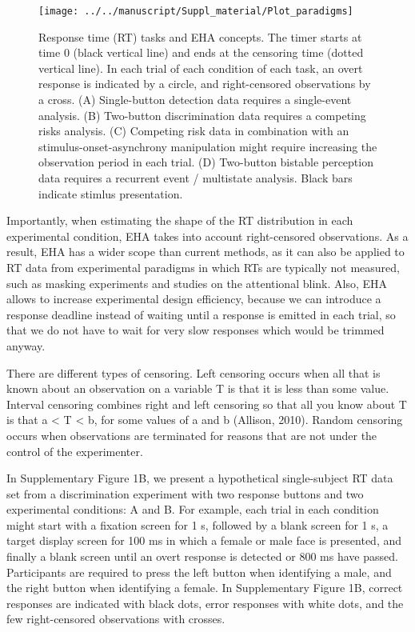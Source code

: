 \documentclass[
  man,floatsintext]{apa6}
\begin{document}
\begin{figure}[H]

{\centering \texttt{[image: ../../manuscript/Suppl\_material/Plot\_paradigms]} 

}

\caption{Response time (RT) tasks and EHA concepts. The timer starts at time 0 (black vertical line) and ends at the censoring time (dotted vertical line). In each trial of each condition of each task, an overt response is indicated by a circle, and right-censored observations by a cross. (A) Single-button detection data requires a single-event analysis. (B) Two-button discrimination data requires a competing risks analysis. (C) Competing risk data in combination with an stimulus-onset-asynchrony manipulation might require increasing the observation period in each trial. (D) Two-button bistable perception data requires a recurrent event / multistate analysis. Black bars indicate stimlus presentation.}\label{fig:plot-RT-tasks}
\end{figure}

Importantly, when estimating the shape of the RT distribution in each experimental condition, EHA takes into account right-censored observations. As a result, EHA has a wider scope than current methods, as it can also be applied to RT data from experimental paradigms in which RTs are typically not measured, such as masking experiments and studies on the attentional blink. Also, EHA allows to increase experimental design efficiency, because we can introduce a response deadline instead of waiting until a response is emitted in each trial, so that we do not have to wait for very slow responses which would be trimmed anyway.

There are different types of censoring. Left censoring occurs when all that is known about an observation on a variable T is that it is less than some value. Interval censoring combines right and left censoring so that all you know about T is that a \textless{} T \textless{} b, for some values of a and b (Allison, 2010). Random censoring occurs when observations are terminated for reasons that are not under the control of the experimenter.

In Supplementary Figure 1B, we present a hypothetical single-subject RT data set from a discrimination experiment with two response buttons and two experimental conditions: A and B. For example, each trial in each condition might start with a fixation screen for 1 s, followed by a blank screen for 1 s, a target display screen for 100 ms in which a female or male face is presented, and finally a blank screen until an overt response is detected or 800 ms have passed. Participants are required to press the left button when identifying a male, and the right button when identifying a female. In Supplementary Figure 1B, correct responses are indicated with black dots, error responses with white dots, and the few right-censored observations with crosses.
\end{document}
